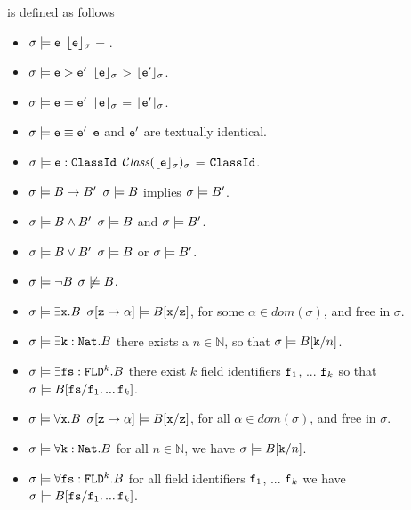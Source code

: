  \begin{definition} is defined  as follows
\label{def:valid"basic:assert}
\begin{itemize}
\item
$\sigma \models {\mbox{\tt{e}}}$ \IFF  ${\lfloor{ {\ensuremath{{\mbox{\tt{e}}}}}}\rfloor_{\sigma}}$ = .
\item
$\sigma \models {\mbox{\tt{e}}}>{\mbox{\tt{e}}}'$ \IFF ${\lfloor{ {\ensuremath{{\mbox{\tt{e}}}}}}\rfloor_{\sigma}}$ > ${\lfloor{ {\ensuremath{{\mbox{\tt{e}}}'}}}\rfloor_{\sigma}}$.
\item
$\sigma \models {\mbox{\tt{e}}}={\mbox{\tt{e}}}'$ \IFF ${\lfloor{ {\ensuremath{{\mbox{\tt{e}}}}}}\rfloor_{\sigma}}$ = ${\lfloor{ {\ensuremath{{\mbox{\tt{e}}}'}}}\rfloor_{\sigma}}$.
\item
$\sigma \models {\mbox{\tt{e}}}\equiv{\mbox{\tt{e}}}'$ \IFF ${\mbox{\tt{e}}}$ and ${\mbox{\tt{e}}}'$ are textually identical.
\item
$\sigma \models  {\mbox{\tt{e}}}:{\mbox{\tt{ClassId}}}$ \IFF ${\mathcal C}{\mathit{lass}}({\lfloor{ {\ensuremath{{\mbox{\tt{e}}}}}}\rfloor_{\sigma}})_{\sigma}$ = ${\mbox{\tt{ClassId}}}$.
\item
$\sigma \models B \rightarrow B' $ \IFF $\sigma \models B$ implies $\sigma \models B'$. 
\item
$\sigma \models B \wedge B' $ \IFF $\sigma \models B$ and $\sigma \models B'$. 
\item
$\sigma \models B \vee B' $ \IFF $\sigma \models B$ or $\sigma \models B'$. 
\item
$\sigma \models\neg  B $ \IFF $\sigma \not\models B$. 
\item
$\sigma \models  \exists {\mbox{\tt{x}}}.B$ \IFF $\sigma[{\mbox{\tt{z}}}\mapsto \alpha] \models  B[{\mbox{\tt{x}}}/{\mbox{\tt{z}}}]$, for some $\alpha\in dom(\sigma)$,  and   free in $\sigma$.
\item
$\sigma \models  \exists {\mbox{\tt{k}}}:{\mbox{\tt{Nat}}}.B$ \IFF  there exists a $n\in\mathbb{N}$, so that   $\sigma \models    B[{\mbox{\tt{k}}}/n]$. 
\item
$\sigma \models  \exists {\mbox{\tt{fs}}}:{\mbox{\tt{FLD}}}^k.B$ \IFF  there exist $k$ field identifiers ${\mbox{\tt{f}}}_1$, ... ${\mbox{\tt{f}}}_k$ so that 
$\sigma \models  B[{\mbox{\tt{fs}}}/{\mbox{\tt{f}}}_1.\,...\,{\mbox{\tt{f}}}_k]$. 
\item
$\sigma \models  \forall {\mbox{\tt{x}}}.B$ \IFF $\sigma[{\mbox{\tt{z}}}\mapsto \alpha] \models  B[{\mbox{\tt{x}}}/{\mbox{\tt{z}}}]$, for all $\alpha\in dom(\sigma)$,  and   free in $\sigma$.
\item
$\sigma \models  \forall {\mbox{\tt{k}}}:{\mbox{\tt{Nat}}}.B$ \IFF for all $n\in\mathbb{N}$, we have   $\sigma \models    B[{\mbox{\tt{k}}}/n]$. 
\item
$\sigma \models  \forall {\mbox{\tt{fs}}}:{\mbox{\tt{FLD}}}^k.B$ \IFF  for all   field identifiers ${\mbox{\tt{f}}}_1$, ... ${\mbox{\tt{f}}}_k$ we have
$\sigma \models  B[{\mbox{\tt{fs}}}/{\mbox{\tt{f}}}_1.\,...\,{\mbox{\tt{f}}}_k]$. 
\end{itemize}
\end{definition}

